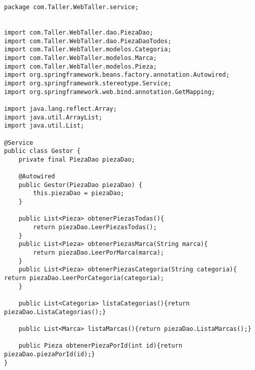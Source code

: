 

\begin{lstlisting}[caption=Gestor.java (LMSI)]
package com.Taller.WebTaller.service;


import com.Taller.WebTaller.dao.PiezaDao;
import com.Taller.WebTaller.dao.PiezaDaoTodos;
import com.Taller.WebTaller.modelos.Categoria;
import com.Taller.WebTaller.modelos.Marca;
import com.Taller.WebTaller.modelos.Pieza;
import org.springframework.beans.factory.annotation.Autowired;
import org.springframework.stereotype.Service;
import org.springframework.web.bind.annotation.GetMapping;

import java.lang.reflect.Array;
import java.util.ArrayList;
import java.util.List;

@Service
public class Gestor {
    private final PiezaDao piezaDao;

    @Autowired
    public Gestor(PiezaDao piezaDao) {
        this.piezaDao = piezaDao;
    }

    public List<Pieza> obtenerPiezasTodas(){
        return piezaDao.LeerPiezasTodas();
    }
    public List<Pieza> obtenerPiezasMarca(String marca){
        return piezaDao.LeerPorMarca(marca);
    }
    public List<Pieza> obtenerPiezasCategoria(String categoria){ return piezaDao.LeerPorCategoria(categoria);
    }

    public List<Categoria> listaCategorias(){return piezaDao.ListaCategorias();}

    public List<Marca> listaMarcas(){return piezaDao.ListaMarcas();}

    public Pieza obtenerPiezaPorId(int id){return piezaDao.piezaPorId(id);}
}
\end{lstlisting}
\clearpage